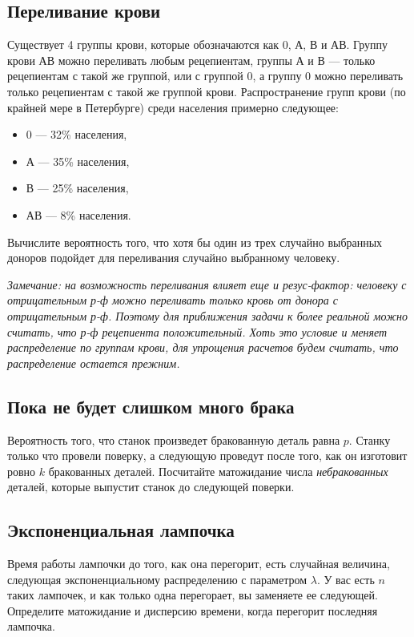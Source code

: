 \documentclass[12pt]{article}
\begin{document}
\subsection{Переливание крови}
Существует 4 группы крови, которые обозначаются как 0, А, В и АВ. Группу крови АВ можно переливать любым рецепиентам, группы А и В --- только рецепиентам с такой же группой, или с группой 0, а группу 0 можно переливать только рецепиентам с такой же группой крови. Распространение групп крови (по крайней мере в Петербурге) среди населения примерно следующее:
\begin{itemize}
    \item 0 --- 32\% населения,
    \item А --- 35\% населения,
    \item В --- 25\% населения,
    \item АВ --- 8\% населения.
\end{itemize}
Вычислите вероятность того, что хотя бы один из трех случайно выбранных доноров подойдет для переливания случайно выбранному человеку. 

\emph{Замечание: на возможность переливания влияет еще и резус-фактор: человеку с отрицательным р-ф можно переливать только кровь от донора с отрицательным р-ф. Поэтому для приближения задачи к более реальной можно считать, что р-ф рецепиента положительный. Хоть это условие и меняет распределение по группам крови, для упрощения расчетов будем считать, что распределение остается прежним.}

\subsection{Пока не будет слишком много брака}
Вероятность того, что станок произведет бракованную деталь равна $p$. Станку только что провели поверку, а следующую проведут после того, как он изготовит ровно $k$ бракованных деталей. Посчитайте матожидание числа \emph{небракованных} деталей, которые выпустит станок до следующей поверки.

\subsection{Экспоненциальная лампочка}
Время работы лампочки до того, как она перегорит, есть случайная величина, следующая экспоненциальному распределению с параметром $\lambda$. У вас есть $n$ таких лампочек, и как только одна перегорает, вы заменяете ее следующей. Определите матожидание и дисперсию времени, когда перегорит последняя лампочка.
\end{document}
